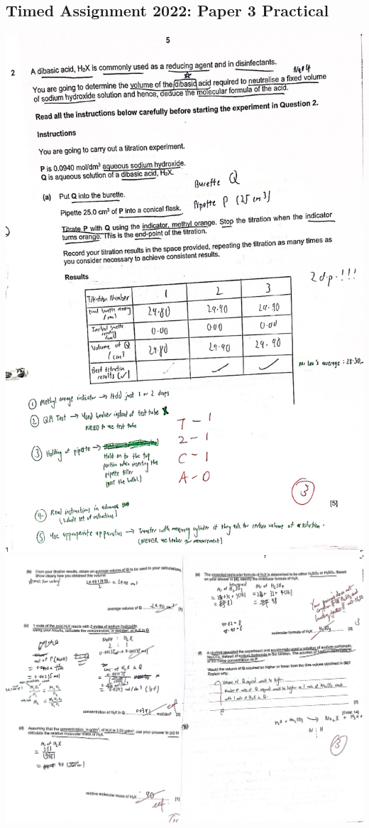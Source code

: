 \documentclass[oneside]{book}
\begin{document}
\subsection{Timed Assignment 2022: Paper 3 Practical}
\begin{center}
    \includegraphics[scale=0.15,keepaspectratio]{images/3DFB9495-1050-41B9-849A-D6F49B74F7E5.jpeg}\\
    \includegraphics[width=\textwidth,height=\textheight,keepaspectratio]{images/C6D5D938-29AD-42AA-A4DB-FA04C2E56D5B.jpeg}
\end{center}
\end{document}
